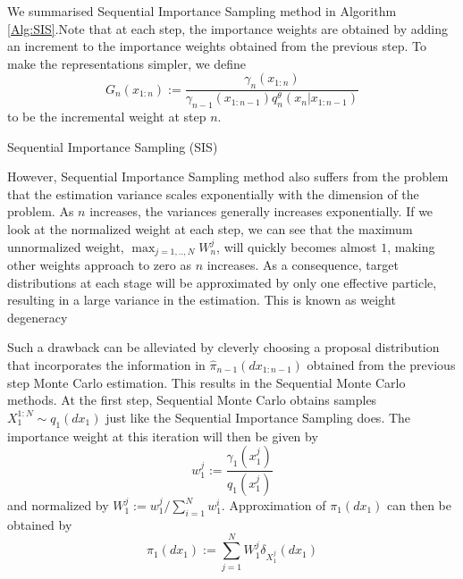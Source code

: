 \documentclass[12pt,a4paper]{article}
\begin{document}
We summarised Sequential Importance Sampling method in Algorithm \ref{Alg:SIS}.Note that at each step, the importance weights are obtained by adding an increment to the importance weights obtained from the previous step. To make the representations simpler, we define 
$$G_n(x_{1:n}) := \frac{\gamma_n(x_{1:n})}{\gamma_{n-1}(x_{1:n-1})q_n^{\theta}(x_n|x_{1:n-1})}$$
to be the incremental weight at step $n$.
\begin{algorithm}[ht]
    \caption{Sequential Importance Sampling (SIS)}\label{Alg:SIS}
    \end{algorithm}

However, Sequential Importance Sampling method also suffers from the problem that the estimation variance scales exponentially with the dimension of the problem. As $n$ increases, the variances generally increases exponentially. If we look at the normalized weight at each step, we can see that the maximum unnormalized weight, $\max_{j=1,..,N} W_n^j$, will quickly becomes almost $1$, making other weights approach to zero as $n$ increases. As a consequence, target distributions at each stage will be approximated by only one effective particle, resulting in a large variance in the estimation. This is known as weight degeneracy 

Such a drawback can be alleviated by cleverly choosing a proposal distribution that incorporates the information in $\hat{\pi}_{n-1}(dx_{1:n-1})$ obtained from the previous step Monte Carlo estimation. This results in the Sequential Monte Carlo methods. At the first step, Sequential Monte Carlo obtains samples $X_1^{1:N} \sim q_1(dx_1)$ just like the Sequential Importance Sampling does. The importance weight at this iteration will then be given by 
\begin{equation}
    \label{SMC-1ST Iter Importance Weight}
    w_{1}^j := \frac{\gamma_{1}\left(x_1^j\right)}{q_1\left(x_1^j\right)}
\end{equation}
and normalized by $W_1^j := w_1^j / \sum_{i=1}^N w_1^i$. Approximation of $\pi_1(dx_1)$ can then be obtained by 
\begin{equation}
    \label{SMC - pi1}
    \hat{\pi}_1\left(dx_1\right) := \sum_{j=1}^{N} W_1^j \delta_{X_1^j} \left(dx_1\right)
\end{equation}
\end{document}
